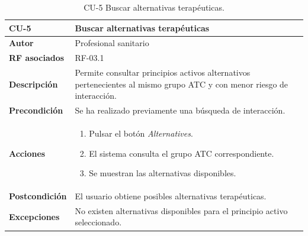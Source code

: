 \begin{table}[ht]
	\centering
	\begin{tabularx}{\linewidth}{ p{} p{} }
		\toprule
		\textbf{CU-5} & \textbf{Buscar alternativas terapéuticas}\\
		\toprule
		\textbf{Autor} & Profesional sanitario\\
		\textbf{RF asociados} & RF-03.1\\
		\textbf{Descripción} & Permite consultar principios activos alternativos pertenecientes al mismo grupo ATC y con menor riesgo de interacción.\\
		\textbf{Precondición} & Se ha realizado previamente una búsqueda de interacción.\\
		\textbf{Acciones} &
		\begin{enumerate}
			\item Pulsar el botón \textit{Alternatives}.
			\item El sistema consulta el grupo ATC correspondiente.
			\item Se muestran las alternativas disponibles.
		\end{enumerate}\\
		\textbf{Postcondición} & El usuario obtiene posibles alternativas terapéuticas.\\
		\textbf{Excepciones} & No existen alternativas disponibles para el principio activo seleccionado.\\
		\bottomrule
	\end{tabularx}
	\caption{CU-5 Buscar alternativas terapéuticas.}
	\label{tab:CU5}
\end{table}
